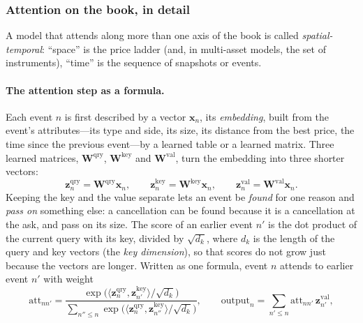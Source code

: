 \subsubsection{Attention on the book, in detail}
\label{sec:attn-detail}

A model that attends along more than one axis of the book is called \emph{spatial-temporal}: ``space'' is the price
ladder (and, in multi-asset models, the set of instruments), ``time'' is the sequence of snapshots or events.

\paragraph{The attention step as a formula.} Each event $n$ is first described by a vector $\mathbf{x}_n$, its
\emph{embedding}, built from the event's attributes---its type and side, its size, its distance from the best price,
the time since the previous event---by a learned table or a learned matrix. Three learned matrices, $\mathbf{W}^{\text{qry}}$,
$\mathbf{W}^{\text{key}}$ and $\mathbf{W}^{\text{val}}$, turn the embedding into three shorter vectors:
\begin{equation}
\mathbf{z}^{\text{qry}}_n = \mathbf{W}^{\text{qry}}\mathbf{x}_n,\qquad
\mathbf{z}^{\text{key}}_n = \mathbf{W}^{\text{key}}\mathbf{x}_n,\qquad
\mathbf{z}^{\text{val}}_n = \mathbf{W}^{\text{val}}\mathbf{x}_n .
\label{eq:qkv}
\end{equation}
Keeping the key and the value separate lets an event be \emph{found} for one reason and \emph{pass on} something
else: a cancellation can be found because it is a cancellation at the ask, and pass on its size. The score of an
earlier event $n'$ is the dot product of the current query with its key, divided by $\sqrt{d_k}$, where $d_k$ is the
length of the query and key vectors (the \emph{key dimension}), so that scores do not grow just because the vectors
are longer. Written as one formula, event $n$ attends to earlier event $n'$ with weight
\begin{equation}
  \mathrm{att}_{n n'} = \frac{\exp\big(\langle \mathbf{z}^{\text{qry}}_n, \mathbf{z}^{\text{key}}_{n'}\rangle/\sqrt{d_k}\big)}
  {\sum_{n'' \le n} \exp\big(\langle \mathbf{z}^{\text{qry}}_n, \mathbf{z}^{\text{key}}_{n''}\rangle/\sqrt{d_k}\big)},
  \qquad \text{output}_n = \sum_{n' \le n} \mathrm{att}_{n n'}\, \mathbf{z}^{\text{val}}_{n'} ,
\label{eq:attn-formula}
\end{equation}

